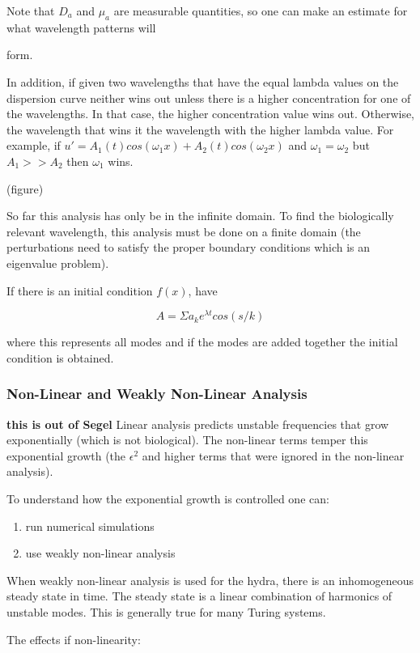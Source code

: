 \documentclass[]{article}
\numberwithin{equation}{section}		%
\def\b#1{{\bf{#1}}}
\def\b#1{{\bf{#1}}}
\begin{document}
Note that $D_a$ and $\mu_a$ are measurable quantities, so one can make an estimate for what wavelength patterns will

form.

In addition, if given two wavelengths that have the equal lambda values on the dispersion curve neither wins out unless there is a higher concentration for one of the wavelengths.  In that case, the higher concentration value wins out.  Otherwise, the wavelength that wins it the wavelength with the higher lambda value.  For example, if $u'=A_1(t)cos(\omega_1x)+A_2(t)cos(\omega_2x)$
and $\omega_1=\omega_2$ but $A_1>>A_2$ then $\omega_1$ wins.

(figure)


So far this analysis has only be in the infinite domain.  To find the biologically relevant wavelength, this analysis must be done on a finite domain (the perturbations need to satisfy the proper boundary conditions which is an eigenvalue problem).

If there is an initial condition $f(x)$, have

$$A=\Sigma a_ke^{\lambda t}cos(s/k)$$

where this represents all modes and if the modes are added together the initial condition is obtained.

\subsubsection{Non-Linear and Weakly Non-Linear Analysis}
\b{this is out of Segel}
Linear analysis predicts unstable frequencies that grow exponentially (which is not biological).  The non-linear terms temper this exponential growth (the $\epsilon^2$ and higher terms that were ignored in the non-linear analysis).

\noindent To understand how the exponential growth is controlled one can:

\begin{enumerate}
\item run numerical simulations
\item use weakly non-linear analysis
\end{enumerate}

When weakly non-linear analysis is used for the hydra, there is an inhomogeneous steady state in time.  The steady state is a linear combination of harmonics of unstable modes.  This is generally true for many Turing systems.

\noindent The effects if non-linearity:
\end{document}
